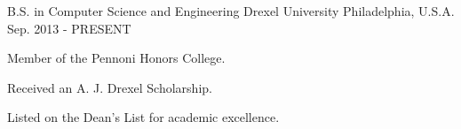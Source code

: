 \begin{cventries}
  \cventry
    {B.S. in Computer Science and Engineering}
    {Drexel University}
    {Philadelphia, U.S.A.}
    {Sep. 2013 - PRESENT}
    {
      \begin{cvitems}
        \item {Member of the Pennoni Honors College.}
        \item {Received an A. J. Drexel Scholarship.}
        \item {Listed on the Dean's List for academic excellence.}
      \end{cvitems}
    }
\end{cventries}
